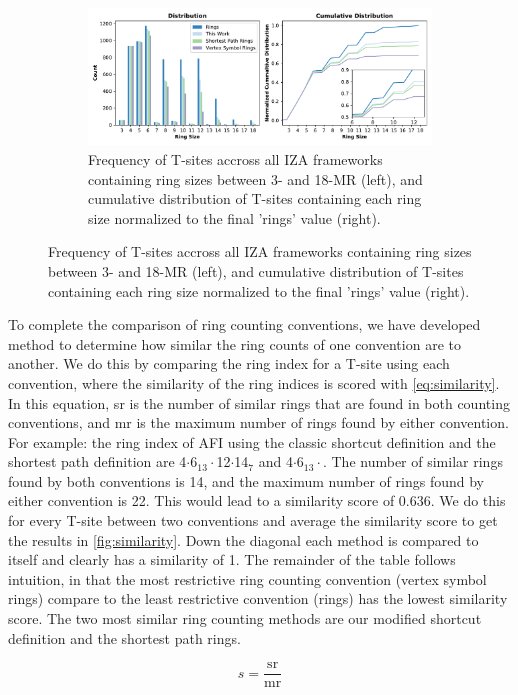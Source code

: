 \documentclass[11pt]{article}
\begin{document}
\begin{figure}
\begin{figure}[H]
\centering
\includegraphics[width=\textwidth]{figures/chapter-3/dist-cumudist.pdf}
\caption{Frequency of T-sites accross all IZA frameworks containing ring sizes between 3- and 18-MR (left), and cumulative distribution of T-sites containing each ring size normalized to the final 'rings' value (right). \label{fig:tsite-frequency}}
\end{figure}
\end{figure}

To complete the comparison of ring counting conventions, we have developed method to determine how similar the ring counts of one convention are to another. We do this by comparing the ring index for a T-site using each convention, where the similarity of the ring indices is scored with \cref{eq:similarity}. In this equation, sr is the number of similar rings that are found in both counting conventions, and mr is the maximum number of rings found by either convention. For example: the ring index of AFI using the classic shortcut definition and the shortest path definition are 4\(\cdot\)6\(_{\text{13}} \cdot\)12\(\cdot\)14\(_{\text{7}}\) and 4\(\cdot\)6\(_{\text{13}} \cdot\). The number of similar rings found by both conventions is 14, and the maximum number of rings found by either convention is 22. This would lead to a similarity score of 0.636. We do this for every T-site between two conventions and average the similarity score to get the results in \cref{fig:similarity}. Down the diagonal each method is compared to itself and clearly has a similarity of 1. The remainder of the table follows intuition, in that the  most restrictive ring counting convention (vertex symbol rings) compare to the least restrictive convention (rings) has the lowest similarity score. The two most similar ring counting methods are our modified shortcut definition and the shortest path rings. 

\begin{equation}\label{eq:similarity}
s = \mathrm{ \frac{sr}{mr} }
\end{equation}
\end{document}
